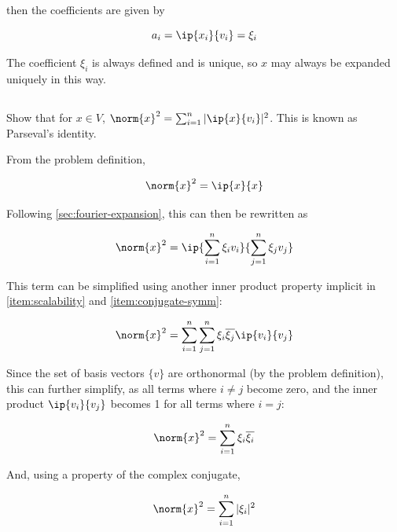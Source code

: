 \documentclass{template}
\begin{document}
then the coefficients are given by

\begin{equation}
    a_i = \ip{x_i}{v_i} = \xi_i
\end{equation}

The coefficient $\xi_i$ is always defined and is unique, so $x$ may always be expanded uniquely in this way.



\subsection{}

Show that for $x \in V$, $\norm{x}^2 = \sum_{i = 1}^n |\ip{x}{v_i}|^2$. This is known as Parseval's identity.



From the problem definition,

\begin{equation}
    \norm{x}^2 = \ip{x}{x}
\end{equation}

Following \autoref{sec:fourier-expansion}, this can then be rewritten as

\begin{equation}
    \norm{x}^2 = \ip{\sum_{i=1}^n \xi_i v_i}{\sum_{j=1}^n \xi_j v_j}
\end{equation}

This term can be simplified using another inner product property implicit in \autoref{item:scalability} and \autoref{item:conjugate-symm}:

\begin{equation}
    \norm{x}^2 = \sum_{i=1}^n \sum_{j=1}^n \xi_i \overline{\xi_j}\ip{v_i}{v_j}
\end{equation}

Since the set of basis vectors $\{v\}$ are orthonormal (by the problem definition), this can further simplify, as all terms where $i\neq j$ become zero, and the inner product $\ip{v_i}{v_j}$ becomes 1 for all terms where $i=j$:

\begin{equation}
    \norm{x}^2 = \sum_{i=1}^n \xi_i \overline{\xi_i}
\end{equation}

And, using a property of the complex conjugate,

\begin{equation}
    \norm{x}^2 = \sum_{i=1}^n |\xi_i|^2
\end{equation}
\end{document}
